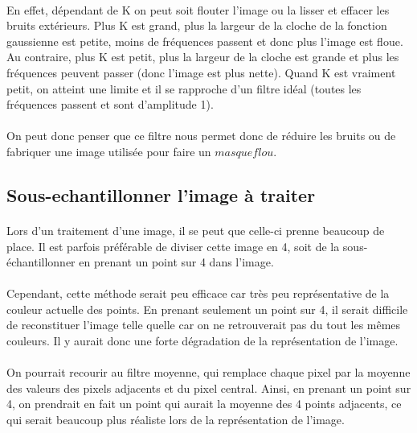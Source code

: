 \documentclass{article}
\begin{document}
\paragraph{}
En effet, dépendant de K on peut soit flouter l’image ou la lisser et effacer les bruits extérieurs. Plus K est grand, plus la largeur de la cloche de la fonction gaussienne est petite, moins de fréquences passent et donc plus l’image est floue. Au contraire, plus K est petit, plus la largeur de la cloche est grande et plus les fréquences peuvent passer (donc l’image est plus nette). Quand K est vraiment petit, on atteint une limite et il se rapproche d’un filtre idéal (toutes les fréquences passent et sont d’amplitude 1). 
\paragraph{}
On peut donc penser que ce filtre nous permet donc de réduire les bruits ou de fabriquer une image utilisée pour faire un $ masque flou $.
\subsection{Sous-echantillonner l'image à traiter}
\paragraph{}
\justifying
Lors d’un traitement d’une image, il se peut que celle-ci prenne beaucoup de place. Il est parfois préférable de diviser cette image en 4, soit de la sous-échantillonner en prenant un point sur 4 dans l’image. 
\paragraph{}
Cependant, cette méthode serait peu efficace car très peu représentative de la couleur actuelle des points. En prenant seulement un point sur 4, il serait difficile de reconstituer l’image telle quelle car on ne retrouverait pas du tout les mêmes couleurs. Il y aurait donc une forte dégradation de la représentation de l’image.
\paragraph{}
On pourrait recourir au filtre moyenne, qui remplace chaque pixel par la moyenne des valeurs des pixels adjacents et du pixel central. Ainsi, en prenant un point sur 4, on prendrait en fait un point qui aurait la moyenne des 4 points adjacents, ce qui serait beaucoup plus réaliste lors de la représentation de l’image.
\end{document}
